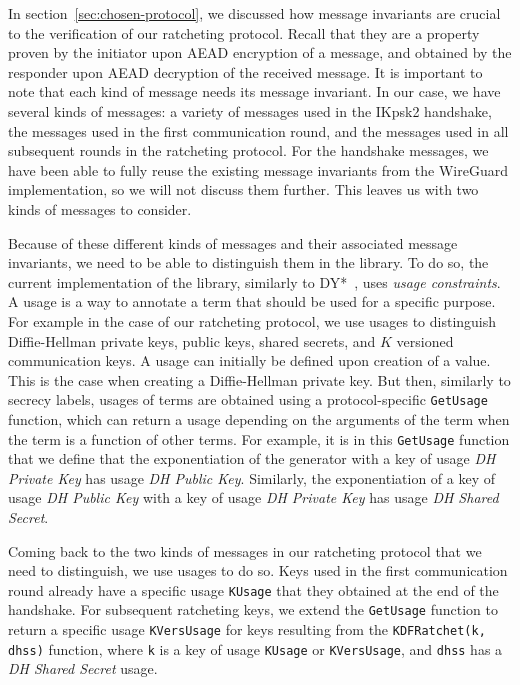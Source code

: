In section~\ref{sec:chosen-protocol}, we discussed how message invariants are crucial to the verification of our ratcheting protocol.
Recall that they are a property proven by the initiator upon AEAD encryption of a message, and obtained by the responder upon AEAD decryption of the received message.
It is important to note that each kind of message needs its message invariant.
In our case, we have several kinds of messages: a variety of messages used in the IKpsk2 handshake, the messages used in the first communication round, and the messages used in all subsequent rounds in the ratcheting protocol.
For the handshake messages, we have been able to fully reuse the existing message invariants from the WireGuard implementation, so we will not discuss them further.
This leaves us with two kinds of messages to consider.

Because of these different kinds of messages and their associated message invariants, we need to be able to distinguish them in the library.
To do so, the current implementation of the library, similarly to DY*~\cite{bhargavan2021text}, uses \emph{usage constraints}.
A usage is a way to annotate a term that should be used for a specific purpose.
For example in the case of our ratcheting protocol, we use usages to distinguish Diffie-Hellman private keys, public keys, shared secrets, and $K$ versioned communication keys.
A usage can initially be defined upon creation of a value. This is the case when creating a Diffie-Hellman private key.
But then, similarly to secrecy labels, usages of terms are obtained using a protocol-specific \texttt{GetUsage} function, which can return a usage depending on the arguments of the term when the term is a function of other terms.
For example, it is in this \texttt{GetUsage} function that we define that the exponentiation of the generator with a key of usage \emph{DH Private Key} has usage \emph{DH Public Key}.
Similarly, the exponentiation of a key of usage \emph{DH Public Key} with a key of usage \emph{DH Private Key} has usage \emph{DH Shared Secret}.

Coming back to the two kinds of messages in our ratcheting protocol that we need to distinguish, we use usages to do so.
Keys used in the first communication round already have a specific usage \texttt{KUsage} that they obtained at the end of the handshake.
For subsequent ratcheting keys, we extend the \texttt{GetUsage} function to return a specific usage \texttt{KVersUsage} for keys resulting from the \texttt{KDFRatchet(k, dhss)} function, where \texttt{k} is a key of usage \texttt{KUsage} or \texttt{KVersUsage}, and \texttt{dhss} has a \emph{DH Shared Secret} usage.

